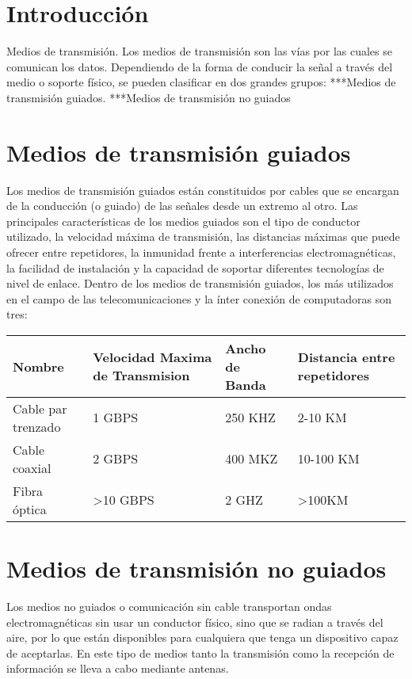 \documentclass[12pt]{article}
\begin{document}


\tableofcontents

\section{Introducción}
Medios de transmisión.
Los medios de transmisión son las vías por las cuales se comunican los datos. Dependiendo de la forma de conducir la señal a través del medio o soporte físico, se pueden clasificar en dos grandes grupos:
***Medios de transmisión guiados.
***Medios de transmisión no guiados

\section{Medios de transmisión guiados}
Los medios de transmisión guiados están constituidos por cables que se encargan de la conducción (o guiado) de las señales desde un extremo al otro. Las principales características de los medios guiados son el tipo de conductor utilizado, la velocidad máxima de transmisión, las distancias máximas que puede ofrecer entre repetidores, la inmunidad frente a interferencias electromagnéticas, la facilidad de instalación y la capacidad de soportar diferentes tecnologías de nivel de enlace.              Dentro de los medios de transmisión guiados, los más utilizados en el campo de las telecomunicaciones y la ínter conexión de computadoras son tres:

\begin{center}
 \begin{tabular}{||p{3 cm} p{3 cm} p{3cm} p{3cm}||} 
 \hline
 \centering
 Nombre & Velocidad Maxima de Transmision & Ancho de Banda & Distancia entre repetidores\\ [3 ex] 
 \hline\hline
 Cable par trenzado & 1 GBPS & 250 KHZ  & 2-10 KM\\ 
 \hline
 Cable coaxial & 2 GBPS & 400 MKZ & 10-100 KM \\
 \hline
 Fibra óptica & >10 GBPS & 2 GHZ & >100KM \\
 \hline
 
\end{tabular}
\end{center}

\section{Medios de transmisión no guiados}
Los medios no guiados o comunicación sin cable transportan ondas electromagnéticas sin usar un conductor físico, sino que se radian a través del aire, por lo que están disponibles para cualquiera que tenga un dispositivo capaz de aceptarlas. En este tipo de medios tanto la transmisión como la recepción de información se lleva a cabo mediante antenas. 
\end{document}
